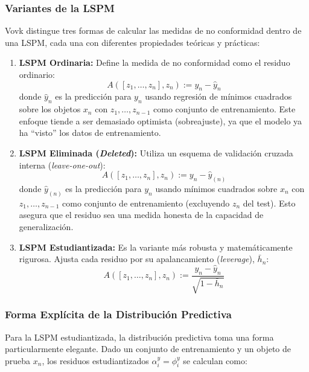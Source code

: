 \subsubsection{Variantes de la LSPM}

Vovk distingue tres formas de calcular las medidas de no conformidad dentro de una LSPM, cada una con diferentes propiedades teóricas y prácticas:

\begin{enumerate}
    \item \textbf{LSPM Ordinaria:} Define la medida de no conformidad como el residuo ordinario:
    \begin{equation}
        A([z_1, \ldots, z_n], z_n) := y_n - \hat{y}_n
    \end{equation}
    donde $\hat{y}_n$ es la predicción para $y_n$ usando regresión de mínimos cuadrados sobre los objetos $x_n$ con $z_1, \ldots, z_{n-1}$ como conjunto de entrenamiento. Este enfoque tiende a ser demasiado optimista (sobreajuste), ya que el modelo ya ha ``visto'' los datos de entrenamiento.
    
    \item \textbf{LSPM Eliminada (\textit{Deleted}):} Utiliza un esquema de validación cruzada interna (\textit{leave-one-out}):
    \begin{equation}
        A([z_1, \ldots, z_n], z_n) := y_n - \hat{y}_{(n)}
    \end{equation}
    donde $\hat{y}_{(n)}$ es la predicción para $y_n$ usando mínimos cuadrados sobre $x_n$ con $z_1, \ldots, z_{n-1}$ como conjunto de entrenamiento (excluyendo $z_n$ del test). Esto asegura que el residuo sea una medida honesta de la capacidad de generalización.
    
    \item \textbf{LSPM Estudiantizada:} Es la variante más robusta y matemáticamente rigurosa. Ajusta cada residuo por su apalancamiento (\textit{leverage}), $\bar{h}_n$:
    \begin{equation}
        A([z_1, \ldots, z_n], z_n) := \frac{y_n - \hat{y}_n}{\sqrt{1 - \bar{h}_n}}
    \end{equation}
\end{enumerate}

\subsubsection{Forma Explícita de la Distribución Predictiva}

Para la LSPM estudiantizada, la distribución predictiva toma una forma particularmente elegante. Dado un conjunto de entrenamiento y un objeto de prueba $x_n$, los residuos estudiantizados $\alpha_i^y = \phi_i^y$ se calculan como:

